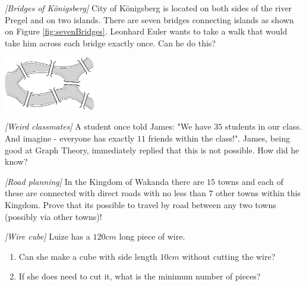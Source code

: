 

%




\noindent 

\begin{problem}
\textit{[Bridges of Königsberg]}
City of Königsberg is located on both sides of the river Pregel and on two islands. There are seven bridges connecting islands as shown on Figure \ref{fig:sevenBridges}. Leonhard Euler wants to take a walk that would take him across each bridge exactly once. Can he do this? 
\begin{center}
\includegraphics[width=4cm]{euler2.png}
\label{fig:sevenBridges}
\end{center} 
\end{problem}
%

\begin{problem}
\textit{[Weird classmates]}
A student once told James: "We have $35$ students in our class. And imagine - everyone has exactly $11$ friends within the class!". James, being good at Graph Theory, immediately replied that this is not possible. How did he know?
\end{problem}
%

\begin{problem}
\textit{[Road planning]}
In the Kingdom of Wakanda there are $15$ towns and each of these are connected with direct roads with no less than $7$ other towns within this Kingdom. Prove that its possible to travel by road between any two towns (possibly via other towns)!
\end{problem}
%

\begin{problem}
\textit{[Wire cube]}
Luize has a $120cm$ long piece of wire.
\begin{enumerate}
\item Can she make a cube with side length $10cm$ without cutting the wire?
\item If she does need to cut it, what is the minimum number of pieces?
\end{enumerate}
\end{problem}
%

